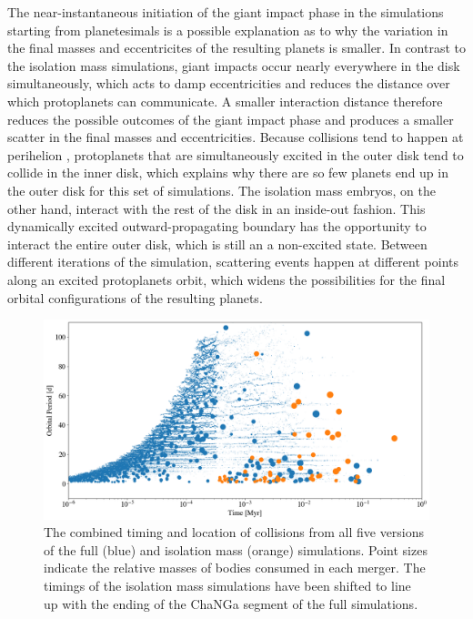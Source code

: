 The near-instantaneous initiation of the giant impact phase in the simulations starting from planetesimals is a possible explanation as to why the variation in the final masses and eccentricites of the resulting planets is smaller. In contrast to the isolation mass simulations, giant impacts occur nearly everywhere in the disk simultaneously, which acts to damp eccentricities and reduces the distance over which protoplanets can communicate. A smaller interaction distance therefore reduces the possible outcomes of the giant impact phase and produces a smaller scatter in the final masses and eccentricities. Because collisions tend to happen at perihelion \cite{levison03}, protoplanets that are simultaneously excited in the outer disk tend to collide in the inner disk, which explains why there are so few planets end up in the outer disk for this set of simulations. The isolation mass embryos, on the other hand, interact with the rest of the disk in an inside-out fashion. This dynamically excited outward-propagating boundary has the opportunity to interact the entire outer disk, which is still an a non-excited state. Between different iterations of the simulation, scattering events happen at different points along an excited protoplanets orbit, which widens the possibilities for the final orbital configurations of the resulting planets.


\begin{figure}
\begin{center}
    \includegraphics[width=\textwidth]{figures/stip/full_coll_iso_comp.png}
    \caption{The combined timing and location of collisions from all five versions of the full (blue) and isolation mass (orange) simulations. Point sizes indicate the relative masses of bodies consumed in each merger. The timings of the isolation mass simulations have been shifted to line up with the ending of the {\sc ChaNGa} segment of the full simulations.\label{fig:full_coll_iso_comp}}
\end{center}
\end{figure}

